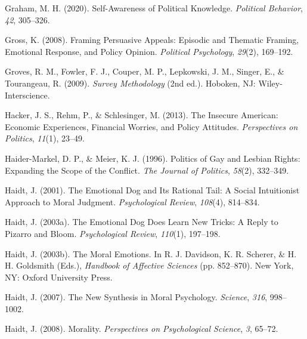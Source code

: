 \documentclass[12pt,econ]{sources/authesis}
\newenvironment{CSLReferences}%
  {}%
  {\par}
\begin{document}
\begin{CSLReferences}{1}{0}
\leavevmode{}%
Graham, M. H. (2020). {Self-Awareness of Political Knowledge}. \emph{Political Behavior}, \emph{42}, 305--326.

\leavevmode{}%
Gross, K. (2008). Framing {Persuasive} {Appeals}: {Episodic} and {Thematic} {Framing}, {Emotional} {Response}, and {Policy} {Opinion}. \emph{Political Psychology}, \emph{29}(2), 169--192.

\leavevmode{}%
Groves, R. M., Fowler, F. J., Couper, M. P., Lepkowski, J. M., Singer, E., \& Tourangeau, R. (2009). \emph{Survey {Methodology}} (2nd ed.). Hoboken, NJ: Wiley-Interscience.

\leavevmode{}%
Hacker, J. S., Rehm, P., \& Schlesinger, M. (2013). The {Insecure} {American}: {Economic} {Experiences}, {Financial} {Worries}, and {Policy} {Attitudes}. \emph{Perspectives on Politics}, \emph{11}(1), 23--49.

\leavevmode{}%
Haider-Markel, D. P., \& Meier, K. J. (1996). {Politics of Gay and Lesbian Rights: Expanding the Scope of the Conflict}. \emph{The Journal of Politics}, \emph{58}(2), 332--349.

\leavevmode{}%
Haidt, J. (2001). {The Emotional Dog and Its Rational Tail: A Social Intuitionist Approach to Moral Judgment}. \emph{Psychological Review}, \emph{108}(4), 814--834.

\leavevmode{}%
Haidt, J. (2003a). {The Emotional Dog Does Learn New Tricks: A Reply to Pizarro and Bloom}. \emph{Psychological Review}, \emph{110}(1), 197--198.

\leavevmode{}%
Haidt, J. (2003b). The {Moral} {Emotions}. In R. J. Davidson, K. R. Scherer, \& H. H. Goldsmith (Eds.), \emph{Handbook of {Affective} {Sciences}} (pp. 852--870). New York, NY: Oxford University Press.

\leavevmode{}%
Haidt, J. (2007). {The New Synthesis in Moral Psychology}. \emph{Science}, \emph{316}, 998--1002.

\leavevmode{}%
Haidt, J. (2008). {Morality}. \emph{Perspectives on Psychological Science}, \emph{3}, 65--72.


\end{CSLReferences}
\end{document}
